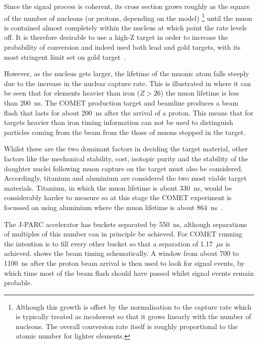 Since the signal process is coherent, its cross section grows roughly as the square of the number of nucleons (or protons, depending on the model)%
\footnote{Although this growth is offset by the normalisation to the capture rate which is typically treated as incoherent so that it grows linearly with the number of nucleons.  The overall conversion rate itself is roughly proportional to the atomic number for lighter elements.}
until the muon is contained almost completely within the nucleus at which point the rate levels off.
It is therefore desirable to use a high-Z target in order to increase the probability of conversion and indeed \sindrumII used both lead and gold targets, with its most stringent limit set on gold target~\cite{sindrum2006}.

However, as the nucleus gets larger, the lifetime of the muonic atom falls steeply due to the increase in the nuclear capture rate.
This is illustrated in  where it can be seen that for elements heavier than iron ($Z>26$) the muon lifetime is less than 200~ns.
The COMET production target and beamline produces a beam flash that lasts for about 200~ns after the arrival of a proton.
This means that for targets heavier than iron timing information can not be used to distinguish particles coming from the beam from the those of muons stopped in the target.

Whilst these are the two dominant factors in deciding the target material, other factors like the mechanical stability, cost, isotopic purity and the stability of the daughter nuclei following muon capture on the target must also be considered.
Accordingly, titanium and aluminium are considered the two most viable target materials.  
Titanium, in which the muon lifetime is about 330~ns, would be considerably harder to measure \mueconv so at this stage the COMET experiment is focussed on using aluminium where the muon lifetime is about 864~ns~\cite{Suzuki1987}.

\FigTimingSchematic

The J-PARC accelerator has buckets separated by 550~ns, although separations of multiples of this number can in principle be achieved.
For COMET running the intention is to fill every other bucket so that a separation of 1.17~$\mu$s is achieved.
 shows the beam timing schematically.  
A window from about 700 to 1100~ns after the proton beam arrival is then used to look for signal events, by which time most of the beam flash should have passed whilst signal events remain probable.

